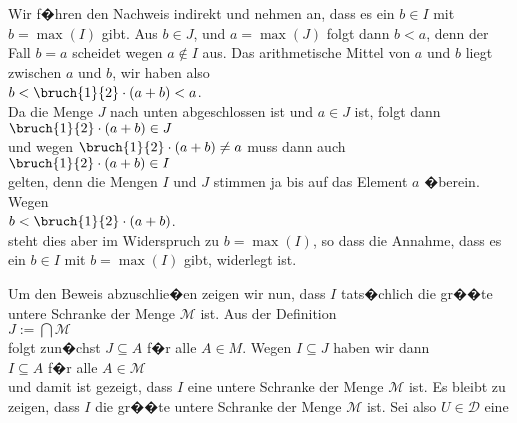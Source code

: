 \begin{enumerate}
\begin{enumerate}
            Wir f�hren den Nachweis indirekt und nehmen an, dass es ein $b \in I$ mit $b = \max(I)$ gibt.
            Aus $b \in J$,  und $a = \max(J)$ folgt dann $b < a$, denn der Fall $b = a$ scheidet
            wegen $a \not\in I$ aus.  Das arithmetische Mittel von $a$ und $b$ liegt zwischen $a$ und
            $b$, wir haben also
            \\[0.2cm]
            \hspace*{1.3cm}
            $b < \bruch{1}{2} \cdot (a + b) < a$.
            \\[0.2cm]
            Da die Menge $J$ nach unten abgeschlossen ist und $a \in J$ ist, folgt dann
            \\[0.2cm]
            \hspace*{1.3cm}
            $\bruch{1}{2} \cdot (a + b) \in J$
            \\[0.2cm]
            und wegen $\bruch{1}{2} \cdot (a + b) \not= a$ muss dann auch
            \\[0.2cm]
            \hspace*{1.3cm}
            $\bruch{1}{2} \cdot (a + b) \in I$
            \\[0.2cm]
            gelten, denn die Mengen $I$ und $J$ stimmen ja bis auf das Element $a$ �berein.  Wegen
            \\[0.2cm]
            \hspace*{1.3cm}
            $b < \bruch{1}{2} \cdot (a + b)$.
            \\[0.2cm]
            steht dies aber im Widerspruch zu $b = \max(I)$, so dass die Annahme, dass 
            es ein $b \in I$ mit $b = \max(I)$ gibt, widerlegt ist.  
      \end{enumerate}
\end{enumerate}
Um den Beweis abzuschlie�en zeigen wir nun, dass $I$ tats�chlich die gr��te untere Schranke der Menge
$\mathcal{M}$ ist.  Aus der Definition
\\[0.2cm]
\hspace*{1.3cm}
$J := \bigcap \mathcal{M}$
\\[0.2cm]
folgt zun�chst $J \subseteq A$ f�r alle $A \in M$.  Wegen $I \subseteq J$ haben wir dann
\\[0.2cm]
\hspace*{1.3cm}
$I \subseteq A$ \quad f�r alle $A \in \mathcal{M}$
\\[0.2cm]
und damit ist gezeigt, dass $I$ eine untere Schranke der Menge $\mathcal{M}$ ist.  Es bleibt zu zeigen,
dass $I$ die gr��te untere Schranke der Menge $\mathcal{M}$ ist.  Sei also $U \in \mathcal{D}$ eine
